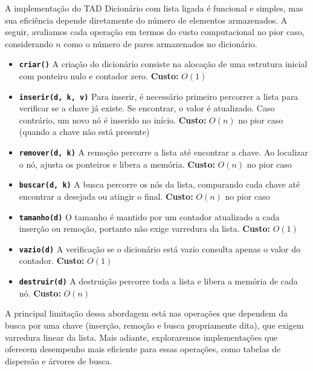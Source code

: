 A implementação do TAD Dicionário com lista ligada é funcional e simples, mas sua eficiência depende diretamente do número de elementos armazenados. A seguir, avaliamos cada operação em termos do custo computacional no pior caso, considerando $n$ como o número de pares armazenados no dicionário.

\begin{itemize}
\item \textbf{\texttt{criar()}}
A criação do dicionário consiste na alocação de uma estrutura inicial com ponteiro nulo e contador zero.
\textbf{Custo:} $O(1)$

\item \textbf{\texttt{inserir(d, k, v)}}
Para inserir, é necessário primeiro percorrer a lista para verificar se a chave já existe. Se encontrar, o valor é atualizado. Caso contrário, um novo nó é inserido no início.
\textbf{Custo:} $O(n)$ no pior caso (quando a chave não está presente)

\item \textbf{\texttt{remover(d, k)}}
A remoção percorre a lista até encontrar a chave. Ao localizar o nó, ajusta os ponteiros e libera a memória.
\textbf{Custo:} $O(n)$ no pior caso

\item \textbf{\texttt{buscar(d, k)}}
A busca percorre os nós da lista, comparando cada chave até encontrar a desejada ou atingir o final.
\textbf{Custo:} $O(n)$ no pior caso

\item \textbf{\texttt{tamanho(d)}}
O tamanho é mantido por um contador atualizado a cada inserção ou remoção, portanto não exige varredura da lista.
\textbf{Custo:} $O(1)$

\item \textbf{\texttt{vazio(d)}}
A verificação se o dicionário está vazio consulta apenas o valor do contador.
\textbf{Custo:} $O(1)$

\item \textbf{\texttt{destruir(d)}}
A destruição percorre toda a lista e libera a memória de cada nó.
\textbf{Custo:} $O(n)$
\end{itemize}

A principal limitação dessa abordagem está nas operações que dependem da busca por uma chave (inserção, remoção e busca propriamente dita), que exigem varredura linear da lista. 
Mais adiante, exploraremos implementações que oferecem desempenho mais eficiente para essas operações, como tabelas de dispersão e árvores de busca.

